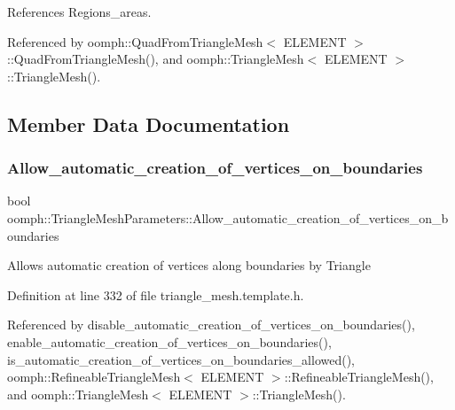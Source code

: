 References Regions\+\_\+areas.



Referenced by oomph\+::\+Quad\+From\+Triangle\+Mesh$<$ E\+L\+E\+M\+E\+N\+T $>$\+::\+Quad\+From\+Triangle\+Mesh(), and oomph\+::\+Triangle\+Mesh$<$ E\+L\+E\+M\+E\+N\+T $>$\+::\+Triangle\+Mesh().



\subsection{Member Data Documentation}
\mbox{\label{classoomph_1_1TriangleMeshParameters_abe02ff536c7f79016947f28a2ffc0b59}} 
\subsubsection{\texorpdfstring{Allow\+\_\+automatic\+\_\+creation\+\_\+of\+\_\+vertices\+\_\+on\+\_\+boundaries}{Allow\_automatic\_creation\_of\_vertices\_on\_boundaries}}
{\footnotesize\ttfamily bool oomph\+::\+Triangle\+Mesh\+Parameters\+::\+Allow\+\_\+automatic\+\_\+creation\+\_\+of\+\_\+vertices\+\_\+on\+\_\+boundaries\hspace{0.3cm}{\ttfamily [protected]}}

Allows automatic creation of vertices along boundaries by Triangle 

Definition at line 332 of file triangle\+\_\+mesh.\+template.\+h.



Referenced by disable\+\_\+automatic\+\_\+creation\+\_\+of\+\_\+vertices\+\_\+on\+\_\+boundaries(), enable\+\_\+automatic\+\_\+creation\+\_\+of\+\_\+vertices\+\_\+on\+\_\+boundaries(), is\+\_\+automatic\+\_\+creation\+\_\+of\+\_\+vertices\+\_\+on\+\_\+boundaries\+\_\+allowed(), oomph\+::\+Refineable\+Triangle\+Mesh$<$ E\+L\+E\+M\+E\+N\+T $>$\+::\+Refineable\+Triangle\+Mesh(), and oomph\+::\+Triangle\+Mesh$<$ E\+L\+E\+M\+E\+N\+T $>$\+::\+Triangle\+Mesh().

